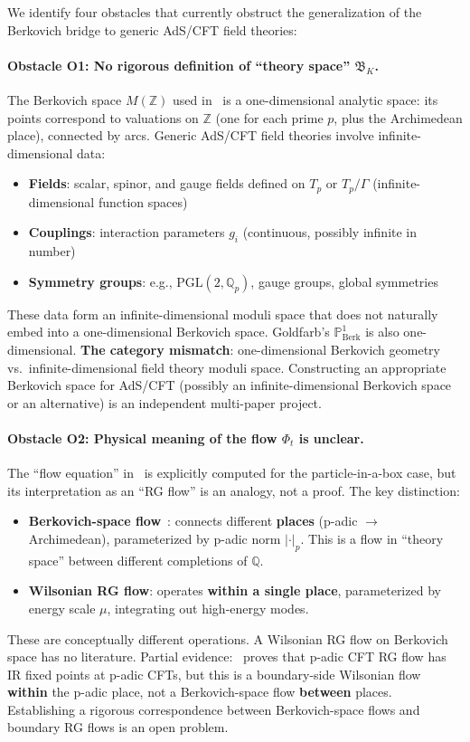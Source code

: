 \documentclass[11pt,a4paper]{article}
\newcommand{\Qp}{\mathbb{Q}_p}
\newcommand{\Q}{\mathbb{Q}}
\newcommand{\PoneBerk}{\mathbb{P}^1_{\mathrm{Berk}}}
\newcommand{\Tp}{T_p}
\newcommand{\PGL}{\mathrm{PGL}}
\begin{document}
We identify four obstacles that currently obstruct the generalization of the Berkovich bridge to generic AdS/CFT field theories:

\paragraph{Obstacle O1: No rigorous definition of ``theory space'' $\mathfrak{B}_K$.}
The Berkovich space $M(\mathbb{Z})$ used in~\cite{HMS20} is a one-dimensional analytic space: its points correspond to valuations on $\mathbb{Z}$ (one for each prime $p$, plus the Archimedean place), connected by arcs. Generic AdS/CFT field theories involve infinite-dimensional data:
\begin{itemize}[leftmargin=2em]
    \item \textbf{Fields}: scalar, spinor, and gauge fields defined on $\Tp$ or $\Tp/\Gamma$ (infinite-dimensional function spaces)
    \item \textbf{Couplings}: interaction parameters $g_i$ (continuous, possibly infinite in number)
    \item \textbf{Symmetry groups}: e.g., $\PGL(2, \Qp)$, gauge groups, global symmetries
\end{itemize}
These data form an infinite-dimensional moduli space that does not naturally embed into a one-dimensional Berkovich space. Goldfarb's $\PoneBerk$ is also one-dimensional. \textbf{The category mismatch}: one-dimensional Berkovich geometry vs.\ infinite-dimensional field theory moduli space. Constructing an appropriate Berkovich space for AdS/CFT (possibly an infinite-dimensional Berkovich space or an alternative) is an independent multi-paper project.

\paragraph{Obstacle O2: Physical meaning of the flow $\Phi_t$ is unclear.}
The ``flow equation'' in~\cite{HMS20} is explicitly computed for the particle-in-a-box case, but its interpretation as an ``RG flow'' is an analogy, not a proof. The key distinction:
\begin{itemize}[leftmargin=2em]
    \item \textbf{Berkovich-space flow}~\cite{HMS20}: connects different \textbf{places} (p-adic $\to$ Archimedean), parameterized by p-adic norm $|\cdot|_p$. This is a flow in ``theory space'' between different completions of $\Q$.
    \item \textbf{Wilsonian RG flow}: operates \textbf{within a single place}, parameterized by energy scale $\mu$, integrating out high-energy modes.
\end{itemize}
These are conceptually different operations. A Wilsonian RG flow on Berkovich space has no literature. Partial evidence:~\cite{HLM19} proves that p-adic CFT RG flow has IR fixed points at p-adic CFTs, but this is a boundary-side Wilsonian flow \textbf{within} the p-adic place, not a Berkovich-space flow \textbf{between} places. Establishing a rigorous correspondence between Berkovich-space flows and boundary RG flows is an open problem.
\end{document}

